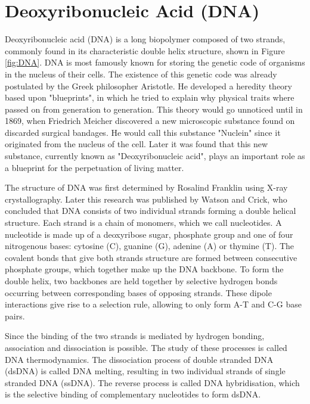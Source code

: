 \section{Deoxyribonucleic Acid (DNA)}


Deoxyribonucleic acid (DNA) is a long biopolymer composed of two strands, commonly found
in its characteristic double helix structure, shown in Figure \ref{fig:DNA}. DNA is most
famously known for storing the
genetic code of organisms in the nucleus of their cells. The existence of this genetic
code was already
postulated by the Greek philosopher Aristotle. He developed a heredity theory based
upon "blueprints", in which he tried to explain why physical traits where passed on from
generation to generation. This theory would go unnoticed until in 1869, when
Friedrich Meicher discovered a new microscopic substance found on discarded
surgical bandages.\cite{Miescher1871} He would call this substance "Nuclein" since it
originated from the nucleus of the cell. Later it was found that this new substance,
currently known as "Deoxyribonucleic acid", plays an important role as a blueprint for
the perpetuation of living matter.\cite{Avery1944}

The structure of DNA was first determined by Rosalind Franklin using X-ray
crystallography. Later this research was published by Watson and Crick, who concluded
that DNA consists of two individual strands forming a double helical
structure.\cite{WATSON1953} Each strand is a chain of monomers, which we call
nucleotides. A nucleotide is made up of a
deoxyribose sugar, phosphate group and one of four nitrogenous bases: cytosine (C),
guanine (G), adenine (A) or thymine (T). The covalent bonds that give both strands
structure
are formed between consecutive phosphate groups, which together make up the DNA backbone.
To form the double helix, two backbones are held together by
selective hydrogen bonds occurring between corresponding bases of opposing strands. These
dipole interactions give rise to a selection rule, allowing to only form A-T and C-G base
pairs.

Since the binding of the two strands is mediated by hydrogen bonding, association and
dissociation is possible. The study of these processes is called DNA thermodynamics. The
dissociation process of double stranded DNA (dsDNA) is called DNA melting, resulting in
two individual strands of single stranded DNA (ssDNA). The reverse process is called DNA
hybridisation, which is the selective binding of complementary nucleotides to form dsDNA.

